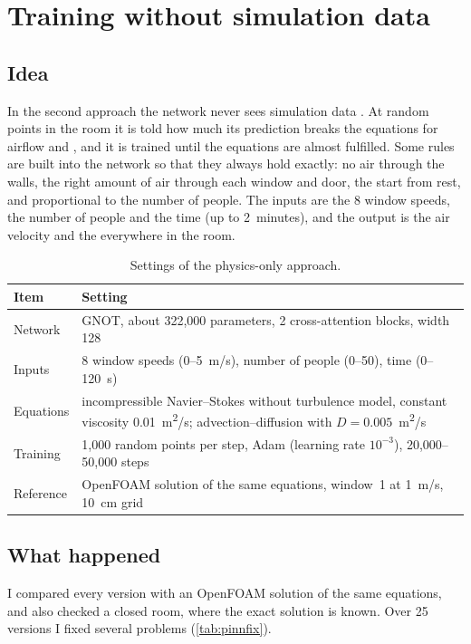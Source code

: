 \chapter{Training without simulation data}
\label{ch:pinn}

\section{Idea}
In the second approach the network never sees simulation data \citep{raissi2019,li2021pino}. At random points in
the room it is told how much its prediction breaks the equations for airflow and \cotwo{}, and it is trained until
the equations are almost fulfilled. Some rules are built into the network so that they always hold exactly: no air
through the walls, the right amount of air through each window and door, the start from rest, and \cotwo{}
proportional to the number of people. The inputs are the 8 window speeds, the number of people and the time (up to
2~minutes), and the output is the air velocity and the \cotwo{} everywhere in the room.

\begin{table}[h]
  \centering
  \caption{Settings of the physics-only approach.}
  \label{tab:pinn}
  \begin{tabular}{>{\raggedright}p{4cm}p{9.7cm}}
    \toprule
    Item & Setting\\
    \midrule
    Network & GNOT, about 322,000 parameters, 2 cross-attention blocks, width 128\\
    Inputs & 8 window speeds (0--5~m/s), number of people (0--50), time (0--120~s)\\
    Equations & incompressible Navier--Stokes without turbulence model, constant viscosity 0.01~m\textsuperscript{2}/s;
                \cotwo{} advection--diffusion with $D=0.005$~m\textsuperscript{2}/s\\
    Training & 1,000 random points per step, Adam (learning rate $10^{-3}$), 20,000--50,000 steps\\
    Reference & OpenFOAM solution of the same equations, window~1 at 1~m/s, 10~cm grid\\
    \bottomrule
  \end{tabular}
\end{table}

\section{What happened}
I compared every version with an OpenFOAM solution of the same equations, and also checked a closed room, where
the exact \cotwo{} solution is known. Over 25 versions I fixed several problems (\cref{tab:pinnfix}).

